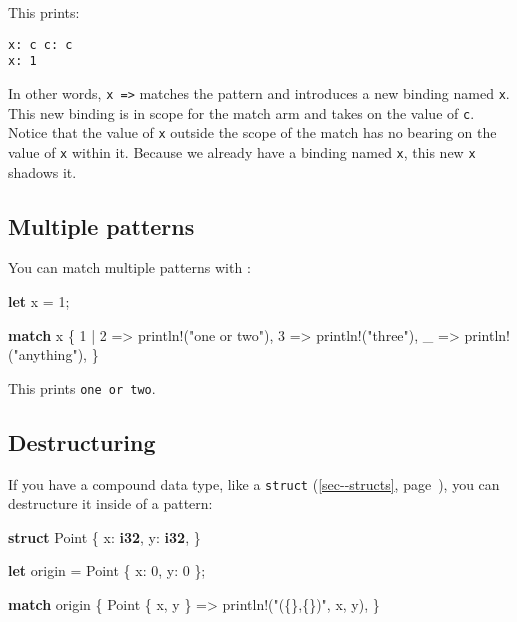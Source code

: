 \documentclass[a4paper,]{book}
\renewcommand*{\hyperref}[2][\ar]{%
  \def\ar{#2}%
  #2 (\autoref{#1}, page~\pageref{#1})}
\newenvironment{Shaded}{\begin{snugshade}}{\end{snugshade}}
\newcommand{\KeywordTok}[1]{\textcolor[rgb]{0.13,0.29,0.53}{\textbf{{#1}}}}
\newcommand{\DecValTok}[1]{\textcolor[rgb]{0.00,0.00,0.81}{{#1}}}
\newcommand{\StringTok}[1]{\textcolor[rgb]{0.31,0.60,0.02}{{#1}}}
\newcommand{\OtherTok}[1]{\textcolor[rgb]{0.56,0.35,0.01}{{#1}}}
\newcommand{\NormalTok}[1]{{#1}}
\begin{document}
This prints:

\begin{verbatim}
x: c c: c
x: 1
\end{verbatim}

In other words, \texttt{x\ =\textgreater{}} matches the pattern and
introduces a new binding named \texttt{x}. This new binding is in scope
for the match arm and takes on the value of \texttt{c}. Notice that the
value of \texttt{x} outside the scope of the match has no bearing on the
value of \texttt{x} within it. Because we already have a binding named
\texttt{x}, this new \texttt{x} shadows it.

\subsection{Multiple patterns}\label{multiple-patterns}

You can match multiple patterns with \texttt{\textbar{}}:

\begin{Shaded}
\begin{Highlighting}[]
\KeywordTok{let} \NormalTok{x = }\DecValTok{1}\NormalTok{;}

\KeywordTok{match} \NormalTok{x \{}
    \DecValTok{1} \NormalTok{| }\DecValTok{2} \NormalTok{=> }\OtherTok{println!}\NormalTok{(}\StringTok{"one or two"}\NormalTok{),}
    \DecValTok{3} \NormalTok{=> }\OtherTok{println!}\NormalTok{(}\StringTok{"three"}\NormalTok{),}
    \NormalTok{_ => }\OtherTok{println!}\NormalTok{(}\StringTok{"anything"}\NormalTok{),}
\NormalTok{\}}
\end{Highlighting}
\end{Shaded}

This prints \texttt{one\ or\ two}.

\subsection{Destructuring}\label{destructuring}

If you have a compound data type, like a
\hyperref[sec--structs]{\texttt{struct}}, you can destructure it inside
of a pattern:

\begin{Shaded}
\begin{Highlighting}[]
\KeywordTok{struct} \NormalTok{Point \{}
    \NormalTok{x: }\KeywordTok{i32}\NormalTok{,}
    \NormalTok{y: }\KeywordTok{i32}\NormalTok{,}
\NormalTok{\}}

\KeywordTok{let} \NormalTok{origin = Point \{ x: }\DecValTok{0}\NormalTok{, y: }\DecValTok{0} \NormalTok{\};}

\KeywordTok{match} \NormalTok{origin \{}
    \NormalTok{Point \{ x, y \} => }\OtherTok{println!}\NormalTok{(}\StringTok{"(\{\},\{\})"}\NormalTok{, x, y),}
\NormalTok{\}}
\end{Highlighting}
\end{Shaded}
\end{document}
